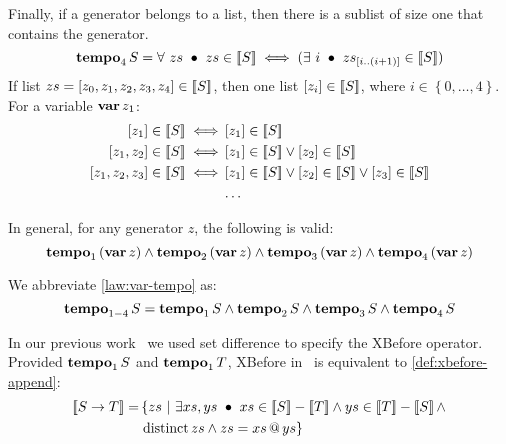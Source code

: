Finally, if a generator belongs to a list, then there is a sublist of size one that contains the generator.
%
\begin{equation}
\tempo[4]{S} = \forall~ zs ~\bullet~ zs \in \denote{S} \iff (\exists~ i ~\bullet~ \slice{zs}{i}{\left(i+1\right)} \in \denote{S})\label{def:tempo4}
\end{equation}
%
If list $zs=\listsin{z_0,z_1,z_2,z_3,z_4} \in \denote{S}$, then one list $\listsin{z_i} \in \denote{S}$, where $i \in \left\{0,\ldots,4\right\}$.
For a variable $\var{z_1}$:
%
%
\begin{align}
\listsin{z_1} \in \denote{S} \iff 
  & \listsin{z_1} \in \denote{S}\nonumber\\
\listsin{z_1,z_2} \in \denote{S} \iff
  & \listsin{z_1} \in \denote{S} \lor \listsin{z_2} \in \denote{S}\nonumber\\
\listsin{z_1,z_2,z_3} \in \denote{S} \iff
  & \listsin{z_1} \in \denote{S} \lor \listsin{z_2} \in \denote{S} \lor \listsin{z_3} \in \denote{S}\nonumber\\
  & \ldots\nonumber
\end{align}

In general, for any generator $z$, the following is valid:
%
\begin{equation}
\label{law:var-tempo}
\tempo[1]{\left(\var{z}\right)} \land
\tempo[2]{\left(\var{z}\right)} \land
\tempo[3]{\left(\var{z}\right)} \land
\tempo[4]{\left(\var{z}\right)}
\end{equation}

We abbreviate \cref{law:var-tempo} as:
\begin{equation}
\tempo{S} = \tempo[1]{S} \land \tempo[2]{S} \land \tempo[3]{S} \land \tempo[4]{S}
\end{equation}

\begin{sloppypar}
In our previous work~\cite{DM2015} we used set difference to specify the \ac{XBefore} operator.
Provided $\tempo[1]{S}$ and $\tempo[1]{T}$, \ac{XBefore} in~\cite{DM2015} is equivalent to \cref{def:xbefore-append}:
%
\begin{align}
\denote{\xbefore{S}{T}} = &\left\{ zs ~\middle|~ \exists xs, ys ~\bullet~ xs \in \denote{S}-\denote{T} \land ys \in \denote{T}-\denote{S} \land \right.\nonumber\\
& \left. \distinct{zs} \land zs = \append{xs}{ys} \right\}\label{law:old-xbefore}
\end{align}
\end{sloppypar}

